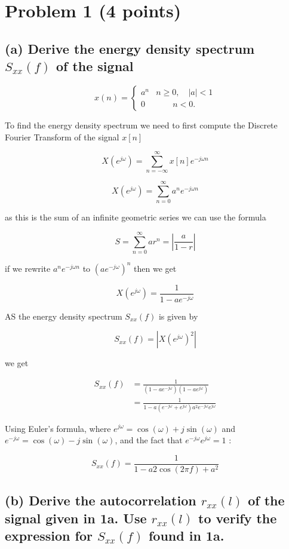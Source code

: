 \section{Problem 1 (4 points)}

\subsection*{(a) Derive the energy density spectrum $S_{x x}(f)$ of the signal}
$$
x(n)=\left\{\begin{array}{cc}
a^n & n \geq 0, \quad|a|<1 \\
0 & \quad \quad n<0 .
\end{array}\right.
$$

To find the energy density spectrum we need to first compute the Discrete Fourier Transform of the signal $x[n]$

$$
X(e^{j\omega})=\sum_{n=-\infty}^{\infty} x[n]e^{-j\omega n}
$$

$$
X(e^{j\omega})=\sum_{n=0}^{\infty} a^ne^{-j\omega n}
$$

as this is the sum of an infinite geometric series we can use the formula

$$
S=\sum_{n=0}^{\infty} ar^n=|\frac{a}{1-r}|
$$

if we rewrite $a^ne^{-j\omega n}$ to $(ae^{-j\omega})^n$ then we get

$$
X(e^{j\omega})=\frac{1}{1-ae^{-j\omega}}
$$

AS the energy density spectrum $S_{x x}(f)$ is given by 

$$S_{x x}(f)=\left|X(e^{j\omega})^2\right|$$

we get

\begin{align*}
    S_{x x}(f)&=\frac{1}{\left(1-ae^{-j\omega}\right)\left(1-ae^{j\omega}\right)}\\
    &=\frac{1}{1-a\left(e^{-j\omega}+e^{j\omega}\right)a^2e^{-j\omega}e^{j\omega}}
\end{align*}


Using Euler's formula, where $e^{j \omega}=\cos (\omega)+j \sin (\omega)$ and $e^{-j \omega}=\cos (\omega)-j \sin (\omega)$, and the fact that $e^{-j \omega} e^{j \omega}=1$ : 

$$S_{x x}(f)=\frac{1}{1-a2 \cos (2\pi f)+a^2}$$

\subsection*{(b) Derive the autocorrelation $r_{x x}(l)$ of the signal given in 1a. Use $r_{x x}(l)$ to verify the expression for $S_{x x}(f)$ found in 1a.}


